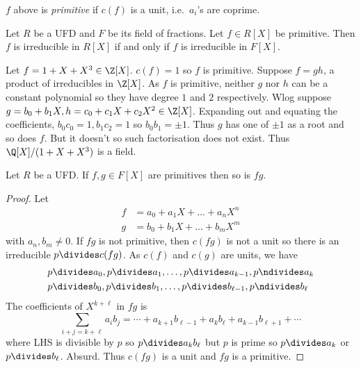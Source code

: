 \documentclass[a4paper]{article}
\theoremstyle{definition}
\begin{document}
\begin{definition}[Primitive]
  \(f\) above is \emph{primitive} if \(c(f)\) is a unit, i.e.\ \(a_i\)'s are coprime.
\end{definition}

\begin{theorem}
  \label{thm:Gauss' lemma}
  Let \(R\) be a UFD and \(F\) be its field of fractions. Let \(f \in R[X]\) be primitive. Then \(f\) is irreducible in \(R[X]\) if and only if \(f\) is irreducible in \(F[X]\).
\end{theorem}

\begin{eg}
  Let \(f = 1 + X + X^3 \in \Z[X]\). \(c(f) = 1\) so \(f\) is primitive. Suppose \(f = gh\), a product of irreducibles in \(\Z[X]\). As \(f\) is primitive, neither \(g\) nor \(h\) can be a constant polynomial so they have degree \(1\) and \(2\) respectively. Wlog suppose \(g = b_0 + b_1X, h = c_0 + c_1X + c_2X^2 \in \Z[X]\). Expanding out and equating the coefficients, \(b_0c_0 = 1, b_1c_2 = 1\) so \(b_0b_1 = \pm 1\). Thus \(g\) has one of \(\pm 1\) as a root and so does \(f\). But it doesn't so such factorisation does not exist. Thus \(\Q[X]/(1 + X + X^3)\) is a field.
\end{eg}

\begin{lemma}
  Let \(R\) be a UFD. If \(f, g \in F[X]\) are primitives then so is \(fg\).
\end{lemma}

\begin{proof}
  Let
  \begin{align*}
    f &= a_0 + a_1X + \dots + a_nX^n \\
    g &= b_0 + b_1X + \dots + b_mX^m
  \end{align*}
  with \(a_n, b_m \neq 0\). If \(fg\) is not primitive, then \(c(fg)\) is not a unit so there is an irreducible \(p \divides c(fg)\). As \(c(f)\) and \(c(g)\) are units, we have
  \begin{align*}
    & p \divides a_0, p \divides a_1, \dots, p \divides a_{k - 1}, p \ndivides a_k \\
    & p \divides b_0, p \divides b_1, \dots, p \divides b_{\ell - 1}, p \ndivides b_\ell
  \end{align*}
  The coefficients of \(X^{k + \ell}\) in \(fg\) is
  \[
    \sum_{i + j = k + \ell} a_ib_j = \cdots + a_{k + 1}b_{\ell - 1} + a_kb_\ell + a_{k - 1}b_{\ell + 1} + \cdots
  \]
  where LHS is divisible by \(p\) so \(p \divides a_kb_\ell\) but \(p\) is prime so \(p \divides a_k\) or \(p \divides b_\ell\). Absurd. Thus \(c(fg)\) is a unit and \(fg\) is a primitive.
\end{proof}
\end{document}
